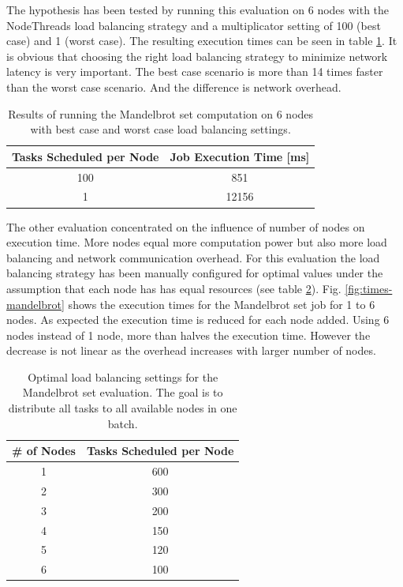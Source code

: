 \documentclass[english]{uzhpub}
\begin{document}
The hypothesis has been tested by running this evaluation on 6 nodes with the NodeThreads load balancing strategy and a multiplicator setting of 100 (best case) and 1 (worst case). The resulting execution times can be seen in table \ref{tab:mandelbrot-lb-res}. It is obvious that choosing the right load balancing strategy to minimize network latency is very important. The best case scenario is more than 14 times faster than the worst case scenario. And the difference is network overhead.

\begin{table}[h!]
\centering
\begin{tabular}{|c|c|}
\hline
\textbf{Tasks Scheduled per Node} & \textbf{Job Execution Time [ms]} \\ \hline
100 & 851 \\ \hline
1 & 12156 \\ \hline
\end{tabular}
\caption{Results of running the Mandelbrot set computation on 6 nodes with best case and worst case load balancing settings.}
\label{tab:mandelbrot-lb-res}
\end{table}

The other evaluation concentrated on the influence of number of nodes on execution time. More nodes equal more computation power but also more load balancing and network communication overhead. For this evaluation the load balancing strategy has been manually configured for optimal values under the assumption that each node has has equal resources (see table \ref{tab:mandelbrot-lb}). Fig. \ref{fig:times-mandelbrot} shows the execution times for the Mandelbrot set job for 1 to 6 nodes. As expected the execution time is reduced for each node added. Using 6 nodes instead of 1 node, more than halves the execution time. However the decrease is not linear as the overhead increases with larger number of nodes.

\begin{table}[h!]
\centering
\begin{tabular}{|c|c|}
\hline
\textbf{\# of Nodes} & \textbf{Tasks Scheduled per Node} \\ \hline
1 & 600 \\ \hline
2 & 300 \\ \hline
3 & 200 \\ \hline
4 & 150 \\ \hline
5 & 120 \\ \hline
6 & 100 \\ \hline
\end{tabular}
\caption{Optimal load balancing settings for the Mandelbrot set evaluation. The goal is to distribute all tasks to all available nodes in one batch.}
\label{tab:mandelbrot-lb}
\end{table}
\end{document}
